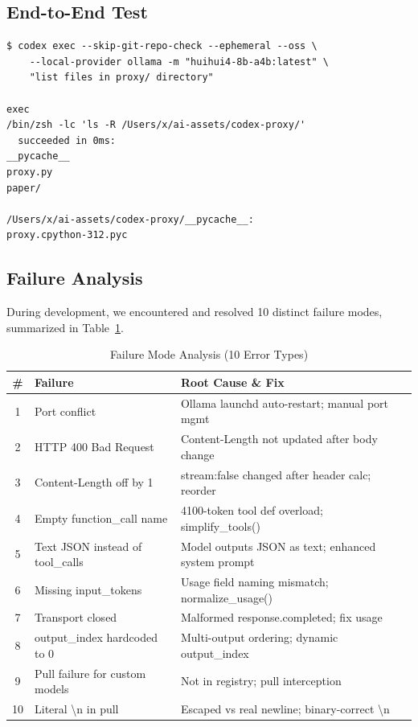 \documentclass[11pt,a4paper]{article}
\begin{document}
\subsection{End-to-End Test}

\begin{lstlisting}
$ codex exec --skip-git-repo-check --ephemeral --oss \
    --local-provider ollama -m "huihui4-8b-a4b:latest" \
    "list files in proxy/ directory"

exec
/bin/zsh -lc 'ls -R /Users/x/ai-assets/codex-proxy/'
  succeeded in 0ms:
__pycache__
proxy.py
paper/

/Users/x/ai-assets/codex-proxy/__pycache__:
proxy.cpython-312.pyc
\end{lstlisting}

\subsection{Failure Analysis}

During development, we encountered and resolved 10 distinct failure modes,
summarized in Table~\ref{tab:failures}.

\begin{table}[H]
\centering
\caption{Failure Mode Analysis (10 Error Types)}
\label{tab:failures}
\begin{tabular}{cll}
\toprule
\textbf{\#} & \textbf{Failure} & \textbf{Root Cause \& Fix} \\
\midrule
1  & Port conflict                     & Ollama launchd auto-restart; manual port mgmt \\
2  & HTTP 400 Bad Request              & Content-Length not updated after body change \\
3  & Content-Length off by 1           & stream:false changed after header calc; reorder \\
4  & Empty function\_call name         & 4100-token tool def overload; simplify\_tools() \\
5  & Text JSON instead of tool\_calls  & Model outputs JSON as text; enhanced system prompt \\
6  & Missing input\_tokens             & Usage field naming mismatch; normalize\_usage() \\
7  & Transport closed                  & Malformed response.completed; fix usage \\
8  & output\_index hardcoded to 0      & Multi-output ordering; dynamic output\_index \\
9  & Pull failure for custom models    & Not in registry; pull interception \\
10 & Literal \textbackslash n in pull  & Escaped vs real newline; binary-correct \textbackslash n \\
\bottomrule
\end{tabular}
\end{table}
\end{document}
